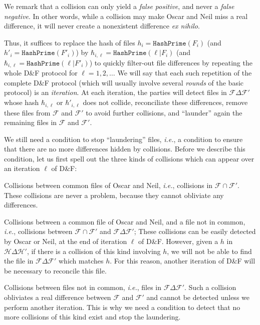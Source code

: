 \documentclass{llncs}
\newcommand{\Set}{\mathcal{H}}
\newcommand{\Files}{\mathcal{F}}
\newcommand{\df}{D\&F\xspace}
\newcommand{\ie}{\textit{i.e.}\xspace}
\newcommand{\eg}{\textit{e.g.}\xspace}
\newcommand{\HashPrime}{\ensuremath{\mathtt{HashPrime}}}
\begin{document}
We remark that a collision can only yield a \textit{false positive}, and never a \textit{false negative}. In other words, while a collision may make Oscar and Neil miss a real difference,
it will never create a nonexistent difference \textit{ex nihilo}.

Thus, it suffices to replace the hash of files $h_i = \HashPrime(F_i)$ (and $h'_i = \HashPrime(F'_i)$) by $\hbar_{i,\ell}=\HashPrime(\ell|F_i)$ (and $\hbar_{i,\ell} = \HashPrime(\ell|F'_i)$) to quickly filter-out file differences by repeating the whole \df protocol for $\ell=1,2,\ldots$ We will say that each such repetition of the complete \df protocol (which will usually involve several \emph{rounds} of the basic protocol) is an \emph{iteration}.
At each iteration, the parties will detect files in $\Files \Delta \Files'$ whose hash $\hbar_{i,\ell}$ or $\hbar'_{i,\ell}$ does not collide, reconciliate these differences, remove these files from $\Files$ and $\Files'$ to avoid further collisions, and ``launder'' again the remaining files in $\Files$ and $\Files'$.

We still need a condition to stop ``laundering'' files, \ie, a condition to ensure that there are no more differences hidden by collisions.
Before we describe this condition, let us first spell out the three kinds of collisions which can appear over an iteration $\ell$ of \df:

\begin{compactenum}
\item Collisions between common files of Oscar and Neil, \ie, collisions in $\Files \cap \Files'$. These collisions are never a problem, because they cannot obliviate any differences.
\item Collisions between a common file of Oscar and Neil, and a file not in common, \ie, collisions between $\Files \cap \Files'$ and $\Files \Delta \Files'$;
These collisions can be easily detected by Oscar or Neil, at the end of iteration $\ell$ of \df. 
However, given a $h$ in $\Set \Delta \Set'$, if there is a collision of this kind involving $h$, we will not be able to find the file in $\Files \Delta \Files'$ which matches $h$. For this reason, another iteration of \df will be necessary to reconcile this file.
\item Collisions between files not in common, \ie, files in $\Files \Delta \Files'$.
  Such a collision obliviates a real difference between $\Files$ and $\Files'$ and cannot be detected unless we perform another iteration. This is why we need a condition to detect that no more collisions of this kind exist and stop the laundering.
\end{compactenum}
\end{document}
